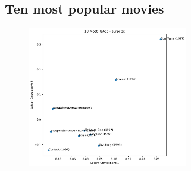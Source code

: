 \subsection{Ten most popular movies}

\begin{figure}[H]
    \centering
\end{figure}
\begin{figure}[H]
    \centering 
    \includegraphics[width=7cm]{pop10_sp.png}
\end{figure}

